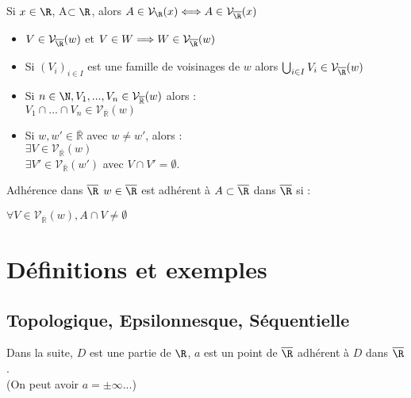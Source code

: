 \documentclass[12pt,a4paper]{report}
\begin{document}
\begin{remarque}
Si $x\in \R$, A$\subset \R$, alors $A \in \mathcal{V}_{\R} (x) \Longleftrightarrow A \in \mathcal{V}_{\overline{\R}} (x)$ 
\end{remarque}

\begin{proposition}{}{}
\begin{itemize}
    \item $V \in \mathcal{V}_{\overline{\R}} (w)$ et $V \in W \Longrightarrow W \in \mathcal{V}_{\overline{\R}} (w)$
    \item Si $(V_i)_{i\in I}$ est une famille de voisinages de $w$ alors $\bigcup_{i\in I} V_i \in \mathcal{V}_{\overline{\R}} (w)$
    \item Si $n \in \N, V_1 , ..., V_n \in \mathcal{V}_{\overline{\mathbb{R}}}(w)$ alors : \\
    $V_1 \cap ... \cap V_n \in \mathcal{V}_{\overline{\mathbb{R}}}(w)$
    \item Si $w,w'\in\overline{\mathbb{R}}$ avec $w\neq w'$, alors : \\
    $\exists V\in\mathcal{V}_{\overline{\mathbb{R}}}(w)$ \\
    $\exists V'\in\mathcal{V}_{\overline{\mathbb{R}}}(w')$ avec $V\cap V'=\emptyset$.
\end{itemize}
\end{proposition}

\begin{definition}{Adhérence dans $\overline{\R}$}{}
$w \in \overline{\R}$ est adhérent à $A \subset \overline{\R}$ dans $\overline{\R}$ si : 
\begin{center}
    $\forall V \in \mathcal{V}_{\overline{\mathbb{R}}}(w), A\cap V \neq \emptyset$
\end{center}
\end{definition}

\section{Définitions et exemples}
\subsection{Topologique, Epsilonnesque, Séquentielle}

Dans la suite, $D$ est une partie de $\R$, $a$ est un point de $\overline{\R}$ adhérent à $D$ dans $\overline{\R}$. \\
(On peut avoir $a=\pm \infty ...$)\\
\end{document}
